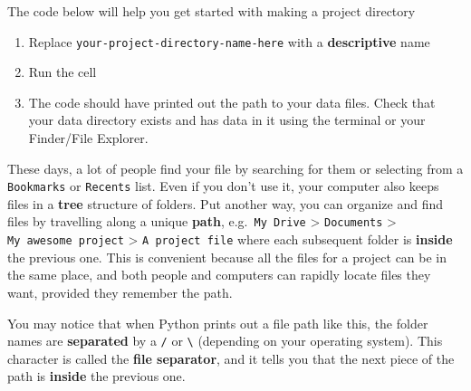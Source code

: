 \documentclass[
  letterpaper,
  DIV=11,
  numbers=noendperiod,
  oneside]{scrreprt}
\providecommand{\tightlist}{%
  \setlength{\itemsep}{0pt}\setlength{\parskip}{0pt}}
\begin{document}
\begin{tcolorbox}[enhanced jigsaw, colbacktitle=quarto-callout-color!10!white, opacityback=0, bottomtitle=1mm, toptitle=1mm, bottomrule=.15mm, left=2mm, colframe=quarto-callout-color-frame, leftrule=.75mm, opacitybacktitle=0.6, colback=white, rightrule=.15mm, toprule=.15mm, breakable, titlerule=0mm, title=\textcolor{quarto-callout-color}{\faInfo}\hspace{0.5em}{Try It: Create a project folder}, coltitle=black, arc=.35mm]

The code below will help you get started with making a project directory

\begin{enumerate}
\def\labelenumi{\arabic{enumi}.}
\tightlist
\item
  Replace
  \texttt{\textquotesingle{}your-project-directory-name-here\textquotesingle{}}
  with a \textbf{descriptive} name
\item
  Run the cell
\item
  The code should have printed out the path to your data files. Check
  that your data directory exists and has data in it using the terminal
  or your Finder/File Explorer.
\end{enumerate}

\end{tcolorbox}

\begin{tcolorbox}[enhanced jigsaw, colbacktitle=quarto-callout-tip-color!10!white, opacityback=0, bottomtitle=1mm, toptitle=1mm, bottomrule=.15mm, left=2mm, colframe=quarto-callout-tip-color-frame, leftrule=.75mm, opacitybacktitle=0.6, colback=white, rightrule=.15mm, toprule=.15mm, breakable, titlerule=0mm, title=\textcolor{quarto-callout-tip-color}{\faLightbulb}\hspace{0.5em}{File structure}, coltitle=black, arc=.35mm]

These days, a lot of people find your file by searching for them or
selecting from a \texttt{Bookmarks} or \texttt{Recents} list. Even if
you don't use it, your computer also keeps files in a \textbf{tree}
structure of folders. Put another way, you can organize and find files
by travelling along a unique \textbf{path}, e.g.~\texttt{My\ Drive}
\textgreater{} \texttt{Documents} \textgreater{}
\texttt{My\ awesome\ project} \textgreater{} \texttt{A\ project\ file}
where each subsequent folder is \textbf{inside} the previous one. This
is convenient because all the files for a project can be in the same
place, and both people and computers can rapidly locate files they want,
provided they remember the path.

You may notice that when Python prints out a file path like this, the
folder names are \textbf{separated} by a \texttt{/} or
\texttt{\textbackslash{}} (depending on your operating system). This
character is called the \textbf{file separator}, and it tells you that
the next piece of the path is \textbf{inside} the previous one.

\end{tcolorbox}
\end{document}
